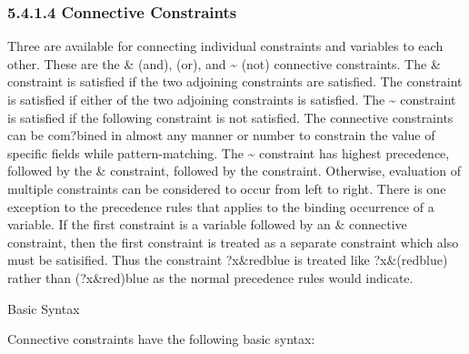 \documentclass[letterpaper,10pt,english]{sphinxmanual}
\begin{document}
\subsubsection{5.4.1.4 Connective Constraints}
\label{\detokenize{defrule:connective-constraints}}
Three  are available for connecting individual
constraints and variables to each other. These are the \& (and), \textbar{} (or),
and \textasciitilde{} (not) connective constraints. The \& constraint is satisfied if the
two adjoining constraints are satisfied. The \textbar{} constraint is satisfied
if either of the two adjoining constraints is satisfied. The \textasciitilde{}
constraint is satisfied if the following constraint is not satisfied.
The connective constraints can be com?bined in almost any manner or
number to constrain the value of specific fields while pattern-matching.
The \textasciitilde{} constraint has highest precedence, followed by the \& constraint,
followed by the \textbar{} constraint. Otherwise, evaluation of multiple
constraints can be considered to occur from left to right. There is one
exception to the precedence rules that applies to the binding occurrence
of a variable. If the first constraint is a variable followed by an \&
connective constraint, then the first constraint is treated as a
separate constraint which also must be satisified. Thus the constraint
?x\&red\textbar{}blue is treated like ?x\&(red\textbar{}blue) rather than (?x\&red)\textbar{}blue as
the normal precedence rules would indicate.

Basic Syntax

Connective constraints have the following basic syntax:

\begin{sphinxVerbatim}[commandchars=\\\{\}]
        

      

 
\end{sphinxVerbatim}
\end{document}
